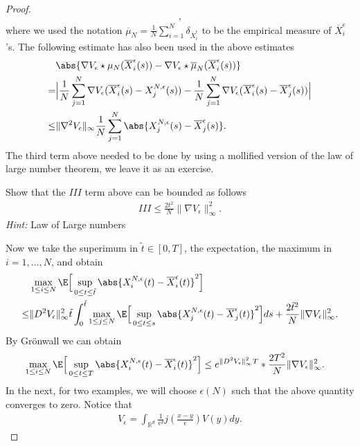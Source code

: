\begin{proof}
\begin{align*}
,\end{align*}
where we used the notation $\overline{\mu}_N=\frac{1}{N} \sum_{i=1}^{N}   \delta_{\overline{X}_i^{\epsilon}  }$ to be the empirical measure of $\overline{X}^\epsilon_i$'s.
The following estimate has also been used in the above estimates
\begin{align*}
&\abs{\nabla V_\epsilon \star  \mu_N(\overline{X}_i^{\epsilon}(s)) - \nabla V_{\epsilon} \star  \overline{\mu }_N(\overline{X}_i^{\epsilon}(s)  ) }\\
 = &\Big|\frac{1}{N}\sum_{j=1}^{N} \nabla V_\epsilon(\overline{X}_i^{\epsilon}(s) - X_j^{N,\epsilon}(s)   )  - \frac{1}{N}\sum_{j=1}^{N} \nabla V_{\epsilon}(\overline{X}_i^{\epsilon}(s)-\overline{X}_j^{\epsilon}(s)    ) \Big|\\
\leq & \|\nabla ^2 V_\epsilon\|_{\infty} \frac{1}{N} \sum_{j=1}^{N} \abs{X_j^{N,\epsilon}(s) - \overline{X}^{\epsilon}_j(s)   }
.\end{align*}
The third term above needed to be done by using a mollified version of the law of large number theorem, we leave it as an exercise.
\begin{exercise}
 Show that the $III$ term above can be bounded as follows
 \begin{align*}
  III \le  \frac{2t^2}{N}\|\nabla V_\epsilon\|_{\infty}^2
 .\end{align*}
\textit{Hint:} Law of Large numbers
\end{exercise}

\vskip5mm
Now we take the superimum in $\tilde t\in [0,T]$, the expectation, the maximum in $i=1,\ldots,N$, and obtain 
\begin{align*}
  &\max_{1 \le i \le N}\E\Big[\sup_{0\leq t\leq \tilde t}\abs{X_i^{N,\epsilon}(t) - \overline{X}_{i}^{\epsilon}(t)}^2  \Big]\\
  \le & \|D^2 V_{\epsilon}\|_{\infty}^2 \tilde t \int_0^{\tilde t}  \max_{1\le j\le N} \E\Big[\sup_{0\leq t\leq s}\abs{X_j^{N,\epsilon}(t) - \overline{X}_j^{\epsilon}(t)  }^2\Big] ds + \frac{2\tilde t^2}{N}\|\nabla V_\epsilon\|_{\infty}^2
.\end{align*}
By Grönwall we can obtain 
\begin{align}\label{sss}
  \max_{1 \le i \le N}\E\Big[\sup_{0\leq t\leq T}\abs{X_i^{N,\epsilon}(t) - \overline{X}_{i}^{\epsilon}(t)}^2 \Big ] &\le e^{\|D^2 V_{\epsilon}\|_{\infty}^2 T} *\frac{2T^2}{N}\|\nabla V_\epsilon\|^2_{\infty}
.\end{align}
In the next, for two examples, we will choose $\epsilon(N)$ such that the above quantity converges to zero. Notice that
\begin{align*}
  V_\epsilon = \int_{\mathbb{R}^{d} }\frac{1}{\epsilon^d}j(\frac{x-y}{\epsilon})V(y) dy
.\end{align*}


\end{proof}
